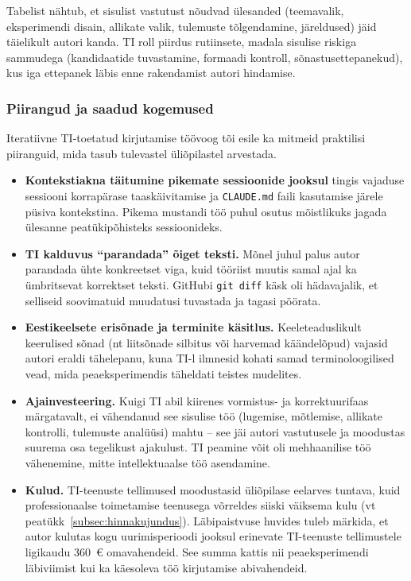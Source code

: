 Tabelist nähtub, et sisulist vastutust nõudvad ülesanded (teemavalik, eksperimendi disain, allikate valik, tulemuste tõlgendamine, järeldused) jäid täielikult autori kanda. TI roll piirdus rutiinsete, madala sisulise riskiga sammudega (kandidaatide tuvastamine, formaadi kontroll, sõnastusettepanekud), kus iga ettepanek läbis enne rakendamist autori hindamise.

\subsubsection{Piirangud ja saadud kogemused}

Iteratiivne TI-toetatud kirjutamise töövoog tõi esile ka mitmeid praktilisi piiranguid, mida tasub tulevastel üliõpilastel arvestada.

\begin{itemize}
    \item \textbf{Kontekstiakna täitumine pikemate sessioonide jooksul} tingis vajaduse sessiooni korrapärase taaskäivitamise ja \texttt{CLAUDE.md} faili kasutamise järele püsiva kontekstina. Pikema mustandi töö puhul osutus mõistlikuks jagada ülesanne peatükipõhisteks sessioonideks.
    \item \textbf{TI kalduvus ``parandada'' õiget teksti.} Mõnel juhul palus autor parandada ühte konkreetset viga, kuid tööriist muutis samal ajal ka ümbritsevat korrektset teksti. GitHubi \texttt{git diff} käsk oli hädavajalik, et selliseid soovimatuid muudatusi tuvastada ja tagasi pöörata.
    \item \textbf{Eestikeelsete erisõnade ja terminite käsitlus.} Keeleteaduslikult keerulised sõnad (nt liitsõnade silbitus või harvemad käändelõpud) vajasid autori eraldi tähelepanu, kuna TI-l ilmnesid kohati samad terminoloogilised vead, mida peaeksperimendis täheldati teistes mudelites.
    \item \textbf{Ajainvesteering.} Kuigi TI abil kiirenes vormistus- ja korrektuurifaas märgatavalt, ei vähendanud see sisulise töö (lugemise, mõtlemise, allikate kontrolli, tulemuste analüüsi) mahtu -- see jäi autori vastutusele ja moodustas suurema osa tegelikust ajakulust. TI peamine võit oli mehhaanilise töö vähenemine, mitte intellektuaalse töö asendamine.
    \item \textbf{Kulud.} TI-teenuste tellimused moodustasid üliõpilase eelarves tuntava, kuid professionaalse toimetamise teenusega võrreldes siiski väiksema kulu (vt peatükk~\ref{subsec:hinnakujundus}). Läbipaistvuse huvides tuleb märkida, et autor kulutas kogu uurimisperioodi jooksul erinevate TI-teenuste tellimustele ligikaudu 360~€ omavahendeid. See summa kattis nii peaeksperimendi läbiviimist kui ka käesoleva töö kirjutamise abivahendeid.
\end{itemize}

